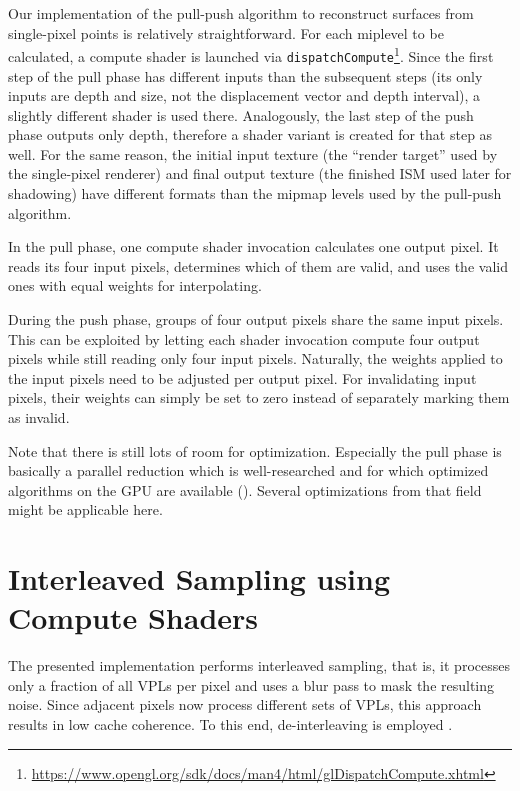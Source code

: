 Our implementation of the pull-push algorithm to reconstruct surfaces from single-pixel points is relatively straightforward. For each miplevel to be calculated, a compute shader is launched via \texttt{dispatchCompute}\footnote{\url{https://www.opengl.org/sdk/docs/man4/html/glDispatchCompute.xhtml}}. Since the first step of the pull phase has different inputs than the subsequent steps (its only inputs are depth and size, not the displacement vector and depth interval), a slightly different shader is used there. Analogously, the last step of the push phase outputs only depth, therefore a shader variant is created for that step as well. For the same reason, the initial input texture (the ``render target'' used by the single-pixel renderer) and final output texture (the finished ISM used later for shadowing) have different formats than the mipmap levels used by the pull-push algorithm.


In the pull phase, one compute shader invocation calculates one output pixel. It reads its four input pixels, determines which of them are valid, and uses the valid ones with equal weights for interpolating.


During the push phase, groups of four output pixels share the same input pixels. This can be exploited by letting each shader invocation compute four output pixels while still reading only four input pixels. Naturally, the weights applied to the input pixels need to be adjusted per output pixel. For invalidating input pixels, their weights can simply be set to zero instead of separately marking them as invalid.

Note that there is still lots of room for optimization. Especially the pull phase is basically a parallel reduction which is well-researched and for which optimized algorithms on the GPU are available (\cite{Harris:2007:ParallelReduction}). Several optimizations from that field might be applicable here.



\section{Interleaved Sampling using Compute Shaders}
\label{sec:impl:interleavedShading}

The presented implementation performs interleaved sampling, that is, it processes only a fraction of all VPLs per pixel and uses a blur pass to mask the resulting noise. Since adjacent pixels now process different sets of VPLs, this approach results in low cache coherence. To this end, de-interleaving is employed \citep{segovia2006non}.

